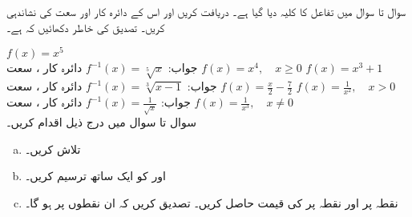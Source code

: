 سوال  تا سوال  میں تفاعل  کا کلیہ دیا گیا ہے۔  دریافت کریں اور اس کے دائرہ کار اور سعت کی نشاندہی کریں۔ تصدیق کی خاطر دکھائیں کہ  ہے۔ 

$f(x)=x^5$\\
جواب:\quad
$f^{-1}(x)=\sqrt[5]{x}$
 دائرہ کار ، سعت 
$f(x)=x^4,\quad x\ge 0$
$f(x)=x^3+1$\\
جواب:\quad
$f^{-1}(x)=\sqrt[3]{x-1}$
دائرہ کار ، سعت 
$f(x)=\tfrac{x}{2}-\tfrac{7}{2}$
$f(x)=\tfrac{1}{x^2},\quad x>0$\\
جواب:\quad
$f^{-1}(x)=\tfrac{1}{\sqrt{x}}$
دائرہ کار ، سعت 
$f(x)=\tfrac{1}{x^3},\quad x\ne 0$
\\
سوال  تا سوال  میں درج ذیل اقدام کریں۔
\begin{enumerate}[a.]
\item
{} تلاش کریں۔
\item
{} اور  کو ایک ساتھ ترسیم کریں۔
\item
نقطہ  پر  اور نقطہ  پر  کی قیمت حاصل کریں۔ تصدیق کریں کہ ان نقطوں پر  ہو گا۔
\end{enumerate}

